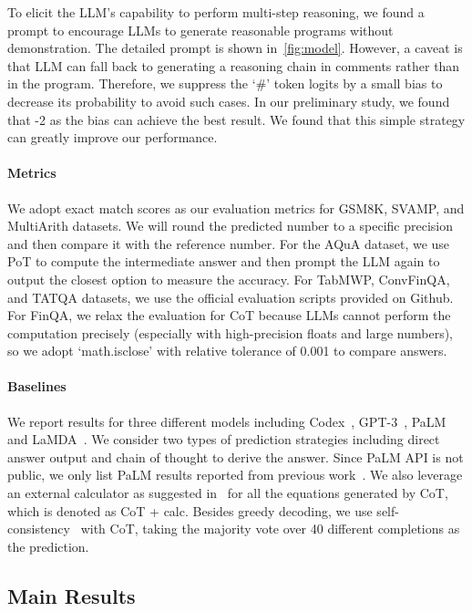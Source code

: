 To elicit the LLM's capability to perform multi-step reasoning, we found a prompt to encourage LLMs to generate reasonable programs without demonstration. The detailed prompt is shown in~\autoref{fig:model}. However, a caveat is that LLM can fall back to generating a reasoning chain in comments rather than in the program. Therefore, we suppress the `\#' token logits by a small bias to decrease its probability to avoid such cases. In our preliminary study, we found that -2 as the bias can achieve the best result. We found that this simple strategy can greatly improve our performance.

\paragraph{Metrics}
We adopt exact match scores as our evaluation metrics for GSM8K, SVAMP, and MultiArith datasets. We will round the predicted number to a specific precision and then compare it with the reference number. For the AQuA dataset, we use PoT to compute the intermediate answer and then prompt the LLM again to output the closest option to measure the accuracy. For TabMWP, ConvFinQA, and TATQA datasets, we use the official evaluation scripts provided on Github. For FinQA, we relax the evaluation for CoT because LLMs cannot perform the computation precisely (especially with high-precision floats and large numbers), so we adopt `math.isclose' with relative tolerance of 0.001 to compare answers. 

\paragraph{Baselines}
We report results for three different models including Codex~\citep{chen2021evaluating}, GPT-3~\citep{brown2020language},  PaLM~\citep{chowdhery2022palm} and LaMDA~\citep{thoppilan2022lamda}. We consider two types of prediction strategies including direct answer output and chain of thought to derive the answer. Since PaLM API is not public, we only list PaLM results reported from previous work~\citep{wei2022chain,wang2022self}. We also leverage an external calculator as suggested in~\cite{wei2022chain} for all the equations generated by CoT, which is denoted as CoT + calc. Besides greedy decoding, we use self-consistency~\citep{wang2022self} with CoT, taking the majority vote over 40 different completions as the prediction. 

\subsection{Main Results}

